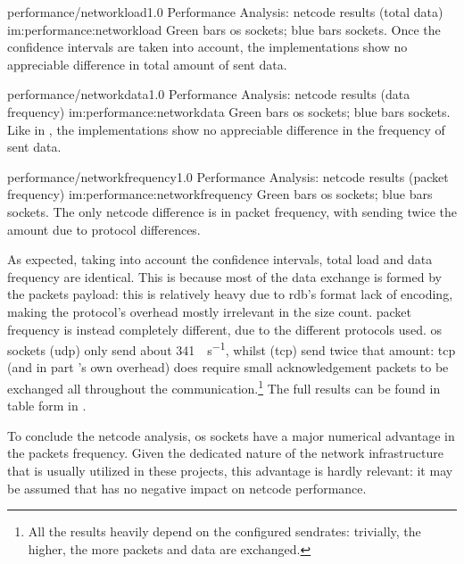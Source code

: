 \begin{image}
	{performance/networkload}{1.0}
	{Performance Analysis: \gls{netcode} results (total data)}
	{im:performance:networkload}
	{}
	{Green bars \gls{os} sockets; blue bars  sockets. Once the confidence intervals are taken into account, the implementations show no appreciable difference in total amount of sent data.}
\end{image}

\begin{image}
	{performance/networkdata}{1.0}
	{Performance Analysis: \gls{netcode} results (data frequency)}
	{im:performance:networkdata}
	{}
	{Green bars \gls{os} sockets; blue bars  sockets. Like in , the implementations show no appreciable difference in the frequency of sent data.}
\end{image}

\begin{image}
	{performance/networkfrequency}{1.0}
	{Performance Analysis: \gls{netcode} results (\gls{packet} frequency)}
	{im:performance:networkfrequency}
	{}
	{Green bars \gls{os} sockets; blue bars  sockets. The only \gls{netcode} difference is in \gls{packet} frequency, with  sending twice the amount due to protocol differences.}
\end{image}

As expected, taking into account the confidence intervals, total load and data frequency are identical. This is because most of the data exchange is formed by the \glspl{packet} \gls{payload}: this is relatively heavy due to \gls{rdb}'s format lack of encoding, making the protocol's overhead mostly irrelevant in the size count. \Gls{packet} frequency is instead completely different, due to the different protocols used. \gls{os} sockets (\gls{udp}) only send about \SI{341}{\packets\per\second}, whilst  (\gls{tcp}) send twice that amount: \gls{tcp} (and in part 's own overhead) does require small acknowledgement \glspl{packet} to be exchanged all throughout the communication.\footnote{All the results heavily depend on the configured \glspl{sendrate}: trivially, the higher, the more \glspl{packet} and data are exchanged.} The full results can be found in table form in .

To conclude the \gls{netcode} analysis, \gls{os} sockets have a major numerical advantage in the \glspl{packet} frequency. Given the dedicated nature of the network infrastructure that is usually utilized in these projects, this advantage is hardly relevant: it may be assumed that  has no negative impact on \gls{netcode} performance.

